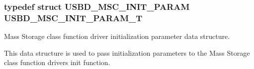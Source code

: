 \subsubsection[{\texorpdfstring{U\+S\+B\+D\+\_\+\+M\+S\+C\+\_\+\+I\+N\+I\+T\+\_\+\+P\+A\+R\+A\+M\+\_\+T}{USBD_MSC_INIT_PARAM_T}}]{\setlength{\rightskip}{0pt plus 5cm}typedef struct {\bf U\+S\+B\+D\+\_\+\+M\+S\+C\+\_\+\+I\+N\+I\+T\+\_\+\+P\+A\+R\+AM}  {\bf U\+S\+B\+D\+\_\+\+M\+S\+C\+\_\+\+I\+N\+I\+T\+\_\+\+P\+A\+R\+A\+M\+\_\+T}}\hypertarget{group__USBD__MSC_ga01cbe726c0ee97ee44661ca88d7e8fbd}{}\label{group__USBD__MSC_ga01cbe726c0ee97ee44661ca88d7e8fbd}


Mass Storage class function driver initialization parameter data structure. 

This data structure is used to pass initialization parameters to the Mass Storage class function driver\textquotesingle{}s init function. 